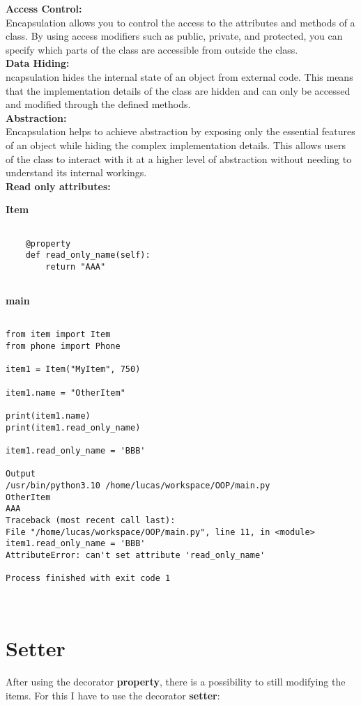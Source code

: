 \documentclass{article}
\begin{document}
\noindent\textbf{Access Control:}\\
Encapsulation allows you to control the access to the attributes and methods of a class. By using access modifiers such as public, private, and protected, you can specify which parts of the class are accessible from outside the class.\\
\noindent\textbf{Data Hiding:}\\
ncapsulation hides the internal state of an object from external code. This means that the implementation details of the class are hidden and can only be accessed and modified through the defined methods.\\
\noindent\textbf{Abstraction:}\\
Encapsulation helps to achieve abstraction by exposing only the essential features of an object while hiding the complex implementation details. This allows users of the class to interact with it at a higher level of abstraction without needing to understand its internal workings.\\

\noindent\textbf{Read only attributes:}

\textbf{Item}
\begin{lstlisting}
	
	@property
	def read_only_name(self):
		return "AAA"
	
\end{lstlisting}

\textbf{main}
\begin{lstlisting}

from item import Item
from phone import Phone

item1 = Item("MyItem", 750)

item1.name = "OtherItem"

print(item1.name)
print(item1.read_only_name)

item1.read_only_name = 'BBB'

Output
/usr/bin/python3.10 /home/lucas/workspace/OOP/main.py 
OtherItem
AAA
Traceback (most recent call last):
File "/home/lucas/workspace/OOP/main.py", line 11, in <module>
item1.read_only_name = 'BBB'
AttributeError: can't set attribute 'read_only_name'

Process finished with exit code 1

	
\end{lstlisting}
\section{Setter}
After using the decorator \textbf{property}, there is a possibility to still modifying the items.
For this I have to use the decorator \textbf{setter}:
\end{document}
